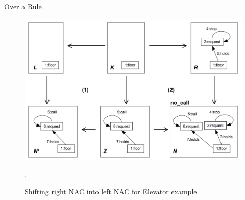 \documentclass[xcolor=dvipsnames,pdf,10pt]{beamer}
\begin{document}
\begin{frame}[allowframebreaks]{Over a Rule}
\begin{figure}[htbp]
\centering
\includegraphics[width=1\textwidth]{fig/shift-right-to-left.png}
\caption{\label{fig:shift-right-to-left} Shifting right NAC into left NAC for Elevator example}.
\end{figure}

\end{frame}
\end{document}
